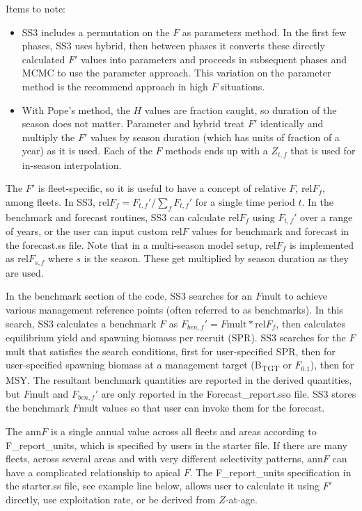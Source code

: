 Items to note:
\begin{itemize}
	\item SS3 includes a permutation on the $F$ as parameters method. In the first few phases, SS3 uses hybrid, then between phases it converts these directly calculated $F'$ values into parameters and proceeds in subsequent phases and MCMC to use the parameter approach. This variation on the parameter method is the recommend approach in high $F$ situations.
	
	\item With Pope's method, the $H$ values are fraction caught, so duration of the season does not matter. Parameter and hybrid treat $F'$ identically and multiply the $F'$ values by season duration (which has units of fraction of a year) as it is used. Each of the $F$ methods ends up with a $Z_{t,f}$ that is used for in-season interpolation.
\end{itemize}

The $F'$ is fleet-specific, so it is useful to have a concept of relative $F$, $\text{rel}F_f$, among fleets. In SS3, $\text{rel}F_f= F_{t,f}'/\sum_{f}^{}F_{t,f}'$ for a single time period $t$. In the benchmark and forecast routines, SS3 can calculate $\text{rel}F_f$ using $F_{t,f}'$ over a range of years, or the user can input custom $\text{rel}F$ values for benchmark and forecast in the forecast.ss file. Note that in a multi-season model setup, $\text{rel}F_f$ is implemented as $\text{rel}F_{s,f}$ where $s$ is the season. These get multiplied by season duration as they are used.

In the benchmark section of the code, SS3 searches for an $F$mult to achieve various management reference points (often referred to as benchmarks). In this search, SS3 calculates a benchmark $F$ as  $F_{ben,f}' = F\text{mult} * \text{rel}F_f$, then calculates equilibrium yield and spawning biomass per recruit (SPR). SS3 searches for the $F$mult that satisfies the search conditions, first for user-specified SPR, then for user-specified spawning biomass at a management target (B\textsubscript{TGT} or $F_{0.1}$), then for MSY. The resultant benchmark quantities are reported in the derived quantities, but $F$mult and $F_{ben,f}'$ are only reported in the Forecast\_report.sso file. SS3 stores the benchmark $F$mult values so that user can invoke them for the forecast.

The $\text{ann}F$ is a single annual value across all fleets and areas according to F\_report\_units, which is specified by users in the starter file. If there are many fleets, across several areas and with very different selectivity patterns, $\text{ann}F$ can have a complicated relationship to apical $F$. The F\_report\_units specification in the starter.ss file, see example line below, allows user to calculate it using $F'$ directly, use exploitation rate, or be derived from $Z$-at-age.

